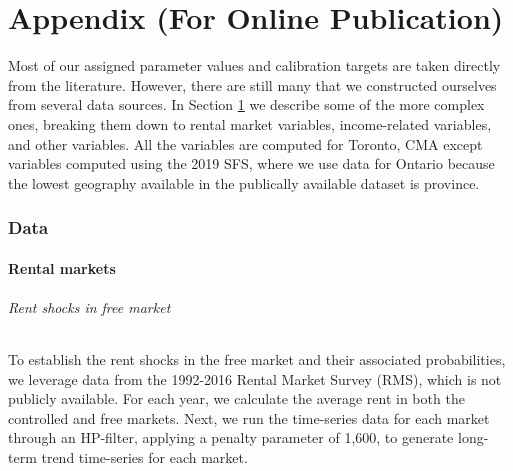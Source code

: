 \documentclass[parskip=full]{article}
\newenvironment{fignote2}[1]
{
\par
\medskip
\begin{minipage}{#1}
\footnotesize
}
{
\end{minipage}
}
\begin{document}
\begin{figure}[H]
\begin{fignote2}{1.0\textwidth}
    \end{fignote2}
\end{figure}
    
\newpage

\appendix

\maketitle


\part*{Appendix (For Online Publication)}

Most of our assigned parameter values and calibration targets are taken directly from the literature. However, there are still many that we constructed ourselves from several data sources. In Section \ref{appendix:data} we describe some of the more complex ones, breaking them down to rental market variables, income-related variables, and other variables. All the variables are computed for Toronto, CMA except variables computed using the 2019 SFS, where we use data for Ontario because the lowest geography available in the publically available dataset is province.

\section{Data}\label{appendix:data}

\subsection{Rental markets}

\paragraph{Rent shocks in free market}

To establish the rent shocks in the free market and their associated probabilities, we leverage data from the 1992-2016 Rental Market Survey (RMS), which is not publicly available. For each year, we calculate the average rent in both the controlled and free markets. Next, we run the time-series data for each market through an HP-filter, applying a penalty parameter of 1,600, to generate long-term trend time-series for each market.
\end{document}
